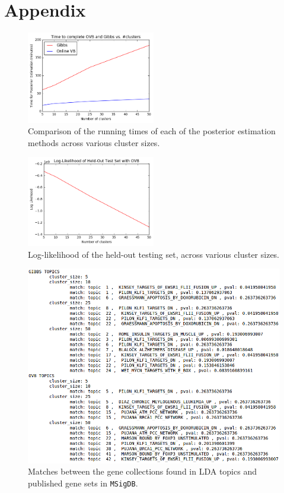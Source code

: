 \documentclass[11pt]{article}
\begin{document}
\section{Appendix}
\begin{figure}
    \centering
    \includegraphics[width=0.5\textwidth]{time}
    \caption{Comparison of the running times of each of the posterior estimation methods across various cluster sizes.}
    \label{fig:time}
\end{figure}

\begin{figure}
    \centering
    \includegraphics[width=0.5\textwidth]{ll}
    \caption{Log-likelihood of the held-out testing set, across various cluster sizes.}
    \label{fig:ll}
\end{figure}

\begin{figure}
    \centering
    \includegraphics[width=1\textwidth]{pathways}
    \caption{Matches between the gene collections found in LDA topics and published gene sets in \texttt{MSigDB}.}
    \label{fig:pathways}
\end{figure}
\end{document}
